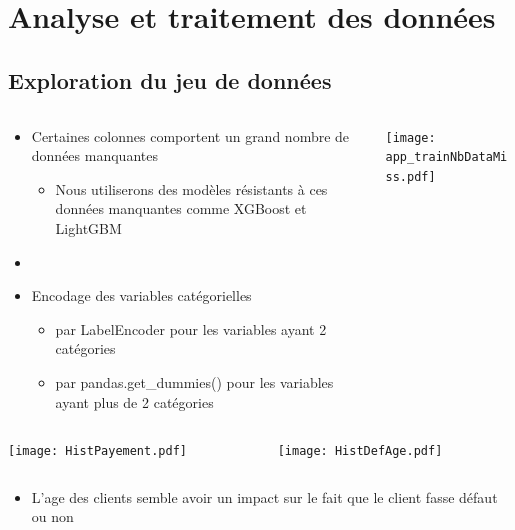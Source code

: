 \documentclass[8pt,aspectratio=169,hyperref={unicode=true}]{beamer}
\begin{document}
\section{Analyse et traitement des données}
\subsection{Exploration du jeu de données}
\begin{frame}{\insertsection}{\insertsubsection}
    \begin{columns}
        \begin{column}{.4\textwidth}
            \begin{itemize}
                \item Certaines colonnes comportent un grand nombre de données manquantes
                      \begin{itemize}
                          \item Nous utiliserons des modèles résistants à ces données manquantes comme XGBoost et LightGBM
                      \end{itemize}
                \item[]
                \item Encodage des variables catégorielles
                      \begin{itemize}
                          \item par LabelEncoder pour les variables ayant 2 catégories
                          \item par pandas.get\_dummies() pour les variables ayant plus de 2 catégories
                      \end{itemize}
            \end{itemize}
        \end{column}
        \begin{column}{.6\textwidth}
            \texttt{[image: app\_trainNbDataMiss.pdf]}
        \end{column}
    \end{columns}
\end{frame}

\begin{frame}{\insertsection}{\insertsubsection}
    \begin{columns}
        \begin{column}{.5\textwidth}
            \texttt{[image: HistPayement.pdf]}
        \end{column}
        \begin{column}{.5\textwidth}
            \texttt{[image: HistDefAge.pdf]}
        \end{column}
    \end{columns}
    \begin{itemize}
        \item L'age des clients semble avoir un impact sur le fait que le client fasse défaut ou non
    \end{itemize}
\end{frame}
\end{document}
